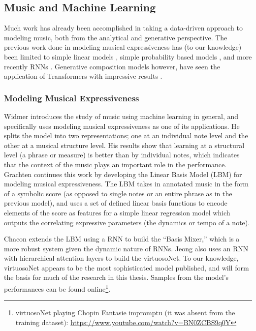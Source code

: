 \documentclass[letterpaper,12pt]{article}
\begin{document}
\subsection{Music and Machine Learning}
Much work has already been accomplished in taking a data-driven approach to modeling music, both from the analytical and generative perspective. The previous work done in modeling musical expressiveness has (to our knowledge) been limited to simple linear models \cite{grachten2012linear}, simple probability based models \cite{widmer2009yqx}, and more recently RNNs \cite{chacon2016basis} \cite{jeong2019virtuosonet}. Generative composition models however, have seen the application of Transformers with impressive results \cite{huang2018music}. 

\subsubsection{Modeling Musical Expressiveness}
Widmer \cite{widmer2000potential} introduces the study of music using machine learning in general, and specifically uses modeling musical expressiveness as one of its applications. He splits the model into two representations; one at an individual note level and the other at a musical structure level. His results show that learning at a structural level (a phrase or measure) is better than by individual notes, which indicates that the context of the music plays an important role in the performance. Grachten \cite{grachten2012linear} continues this work by developing the Linear Basis Model (LBM) for modeling musical expressiveness. The LBM takes in annotated music in the form of a symbolic score (as opposed to single notes or an entire phrase as in the previous model), and uses a set of defined linear basis functions to encode elements of the score as features for a simple linear regression model which outputs the correlating expressive parameters (the dynamics or tempo of a note). 

Chacon \cite{chacon2016basis} extends the LBM using a RNN to build the “Basis Mixer,” which is a more robust system given the dynamic nature of RNNs. Jeong \cite{jeong2019virtuosonet} also uses an RNN with hierarchical attention layers to build the virtuosoNet. To our knowledge, virtuosoNet appears to be the most sophisticated model published, and will form the basis for much of the research in this thesis. Samples from the model's performances can be found online\footnote{virtuosoNet playing Chopin Fantasie impromptu (it was absent from the training dataset): \url{https://www.youtube.com/watch?v=BN0ZCBS9q0Y}}. 
\end{document}
